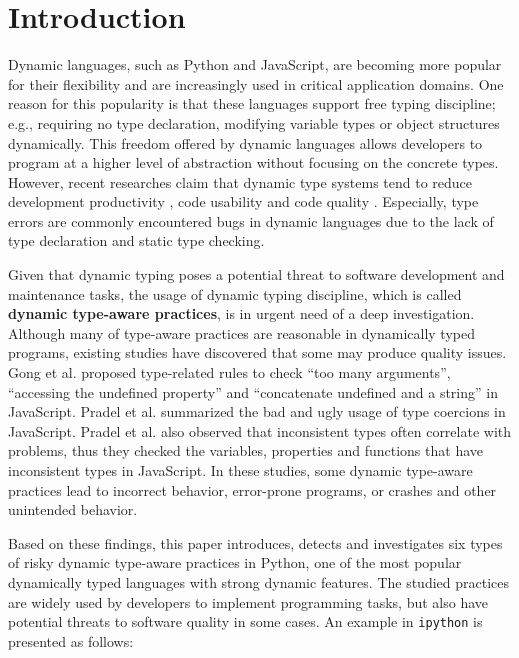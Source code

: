 \section{Introduction}\label{sec:intro}

Dynamic languages, such as Python and JavaScript, are becoming more popular for their flexibility and are increasingly used in critical application domains. One reason for this popularity is that these languages support free typing discipline; e.g., requiring no type declaration, modifying variable types or object structures dynamically. This freedom offered by dynamic languages allows developers to program at a higher level of abstraction without focusing on the concrete types. However, recent researches claim that dynamic type systems tend to reduce development productivity \cite{b25}, code usability\cite{b26} and code quality \cite{b10,b27,b28}. Especially, type errors are commonly encountered bugs in dynamic languages due to the lack of type declaration and static type checking\cite{b15}. 

Given that dynamic typing poses a potential threat to software development and maintenance tasks, the usage of dynamic typing discipline, which is called \textbf{dynamic type-aware practices}, is in urgent need of a deep investigation. Although many of type-aware practices are reasonable in dynamically typed programs, existing studies have discovered that some may produce quality issues. Gong et al.\cite{b11} proposed type-related rules to check ``too many arguments'', ``accessing the undefined property'' and ``concatenate undefined and a string'' in JavaScript. Pradel et al. \cite{b2} summarized the bad and ugly usage of type coercions in JavaScript. Pradel et al. \cite{b1} also observed that inconsistent types often correlate with problems, thus they checked the variables, properties and functions that have inconsistent types in JavaScript. In these studies, some dynamic type-aware practices lead to incorrect behavior, error-prone programs, or crashes and other unintended behavior.


Based on these findings, this paper introduces, detects and investigates six types of risky dynamic type-aware practices in Python\cite{b35}, one of the most popular dynamically typed languages with strong dynamic features. The studied practices are widely used by developers to implement programming tasks, but also have potential threats to software quality in some cases. An example in {\tt ipython}\cite{b36} is presented as follows:

